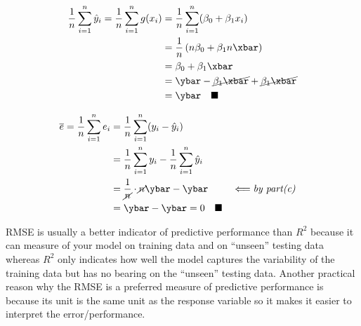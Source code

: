 \documentclass[12pt]{article}
\newcommand{\snmath}{\displaystyle\sum_{i=1}^n}
\begin{document}
\begin{enumerate}

\begin{tcolorbox}[colback=white, sharp corners]

\begin{align*}
	\dfrac{1}{n} \snmath \hat{y}_i = \dfrac{1}{n} \snmath g(x_i) &= \dfrac{1}{n} \snmath (\beta_0 + \beta_1 x_i) \\
	&= \dfrac{1}{n} \left(n \beta_0 + \beta_1 n \xbar \right) \\
	&= \beta_0 + \beta_1 \xbar \\
	&= \ybar - \cancel{\beta_1 \xbar} + \cancel{\beta_1 \xbar} \\
	&= \ybar \quad \blacksquare
\end{align*}

\end{tcolorbox}

\newpage

\begin{tcolorbox}[colback=white, sharp corners]
\begin{align*}
	\overline{e} = \dfrac{1}{n} \snmath e_i &= \dfrac{1}{n} \snmath (y_i - \hat{y}_i)\\
	&= \dfrac{1}{n} \snmath y_i - \dfrac{1}{n} \snmath \hat{y}_i\\
	&= \dfrac{1}{\cancel{n}} \cdot \cancel{n}\ybar - \ybar && \Longleftarrow \emph{by part(c)}\\
	&= \ybar - \ybar = 0 \quad \blacksquare
\end{align*}
\end{tcolorbox}


\begin{tcolorbox}[colback=white, sharp corners]

RMSE is usually a better indicator of predictive performance than $R^2$ because it can measure of your model on training data and on ``unseen'' testing data whereas $R^2$ only indicates how well the model captures the variability of the training data but has no bearing on the ``unseen'' testing data. Another practical reason why the RMSE is a preferred measure of predictive performance is because its unit is the same unit as the response variable so it makes it easier to interpret the error/performance. 


\end{tcolorbox}
\end{enumerate}
\end{document}
